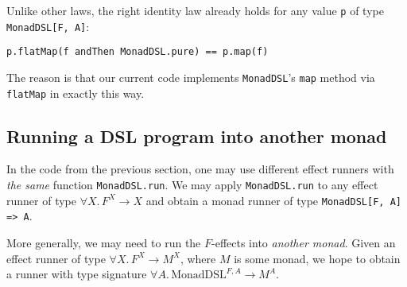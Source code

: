 Unlike other laws, the right identity law already holds for any value
\lstinline!p! of type \lstinline!MonadDSL[F, A]!:
\begin{lstlisting}
p.flatMap(f andThen MonadDSL.pure) == p.map(f)
\end{lstlisting}
The reason is that our current code implements \lstinline!MonadDSL!\textsf{'}s
\lstinline!map! method
via \lstinline!flatMap!
in exactly this way. 

\subsection{Running a DSL program into another monad}

In the code from the previous section, one may use different effect
runners with \emph{the same} function \lstinline!MonadDSL.run!.
We may apply \lstinline!MonadDSL.run!
to any effect runner of type $\forall X.\,F^{X}\rightarrow X$ and
obtain a monad runner of type \lstinline!MonadDSL[F, A] => A!.

More generally, we may need to run the $F$-effects into \emph{another
monad}. Given an effect runner of type $\forall X.\,F^{X}\rightarrow M^{X}$,
where $M$ is some monad, we hope to obtain a runner with type signature
$\forall A.\,\text{MonadDSL}^{F,A}\rightarrow M^{A}$.

